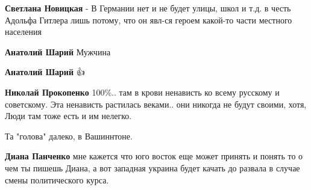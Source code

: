 \begin{itemize}
\begin{itemize}
 
\textbf{Светлана Новицкая} - В Германии нет и не будет улицы, школ и т.д. в честь Адольфа Гитлера лишь потому, что он явл-ся героем какой-то части местного населения

 
\textbf{Анатолий Шарий} Мужчина🤘🏻

 
\textbf{Анатолий Шарий} 👍

 
\textbf{Николай Прокопенко} 100\%.. там в крови ненависть ко всему русскому и
советскому. Эта ненависть растилась веками.. они никогда не будут своими, хотя,
Люди там тоже есть и им нелегко.

 
Та "голова" далеко, в Вашиннтоне.

 
\textbf{Диана Панченко} мне кажется что юго восток еще может принять и понять
то о чем ты пишешь Диана, а вот западная украина будет качать до развала в
случае смены политического курса.


\end{itemize}
\end{itemize}
